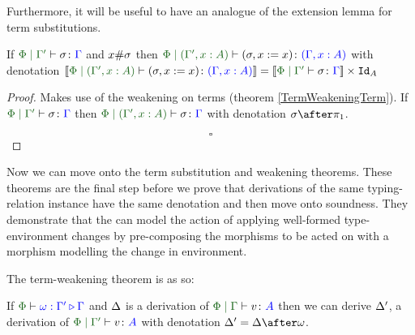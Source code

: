\documentclass{Report}
\begin{document}
Furthermore, it will be useful to have an analogue of the extension lemma for term substitutions.


\begin{lemma}
    If $\etyperelation{\P}{\G'}{\si}{\G}$ and $x\#\sigma$ then $\etyperelation{\P}{(\G',x: A)}{(\si, x\setto x)}{(\gax)}$ with denotation $\deno{\etyperelation{\P}{(\G',x: A)}{(\si, x\setto x)}{(\gax)}} = \deno{\etyperelation{\P}{\G'}{\si}{\G}} \times \Id{A}$
\end{lemma}

\begin{proof}
     Makes use of the weakening on terms (theorem \ref{TermWeakeningTerm}). If $\etyperelation{\P}{\G'}{\si}{\G}$ then $\etyperelation{\P}{(\G', x:A) }{\si}{\G}$ with denotation $\si\after\p$.

     $$\square$$
\end{proof}


Now we can move onto the term substitution and weakening theorems. These theorems are the final step before we prove that derivations of the same typing-relation instance have the same denotation and then move onto soundness. They demonstrate that the can model the action of applying well-formed type-environment changes by pre-composing the morphisms to be acted on with a morphism modelling the change in environment.

The term-weakening theorem is as so: 

\begin{theorem}\label{TermWeakeningTerm}
    If $\pewrel{\w}{\G'}{\G}$ and $\Delta$ is a derivation of $\gpetyperelation{v}{A}$ then we can derive $\Delta'$, a derivation of $\etyperelation{\P}{\G'}{v}{A}$ with denotation $\D' = \D\after\w$.
\end{theorem}
\end{document}
